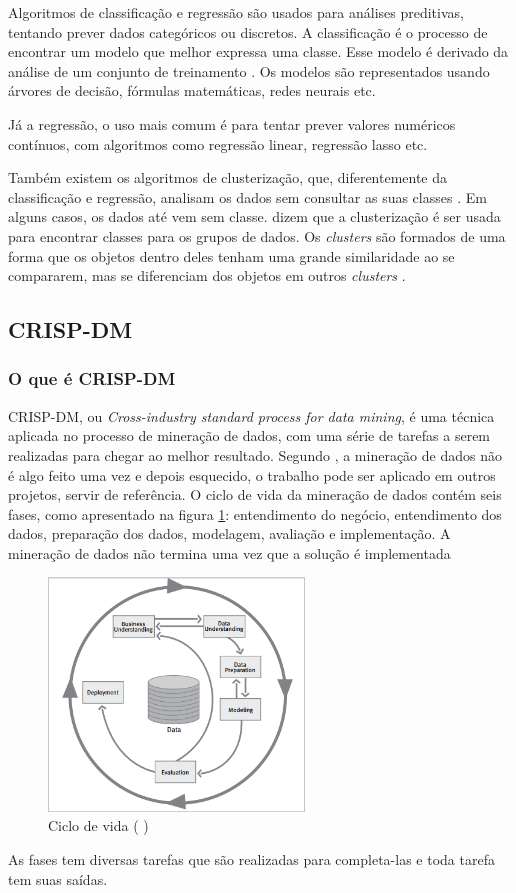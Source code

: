 Algoritmos de classificação e regressão são usados para análises preditivas, tentando prever dados categóricos ou discretos. A classificação é o processo de encontrar um modelo que melhor expressa uma classe. Esse modelo é derivado da análise de um conjunto de treinamento \citep{jmj}. Os modelos são representados usando árvores de decisão, fórmulas matemáticas, redes neurais etc.

Já a regressão, o uso mais comum é para tentar prever valores numéricos contínuos, com algoritmos como regressão linear, regressão lasso etc.

Também existem os algoritmos de clusterização, que, diferentemente da classificação e regressão, analisam os dados sem consultar as suas classes \citep{jmj}. Em alguns casos, os dados até vem sem classe. \citeauthor{jmj} dizem que a clusterização é ser usada para encontrar classes para os grupos de dados. Os \textit{clusters} são formados de uma forma que os objetos dentro deles tenham uma grande similaridade ao se compararem, mas se diferenciam dos objetos em outros \textit{clusters} \citep{jmj}.

\subsection{CRISP-DM}
\subsubsection{O que é CRISP-DM}
CRISP-DM, ou\textit{ Cross-industry standard process for data mining}, é uma técnica aplicada no processo de mineração de dados, com uma série de tarefas a serem realizadas para chegar ao melhor resultado.
Segundo , a mineração de dados não é algo feito uma vez e depois esquecido, o trabalho pode ser aplicado em outros projetos, servir de referência.
O ciclo de vida da mineração de dados contém seis fases, como apresentado na figura \ref{crispcycle}: entendimento do negócio, entendimento dos dados, preparação dos dados, modelagem, avaliação e implementação. 
A mineração de dados não termina uma vez que a solução é implementada \citep{crispmanual}
\begin{figure}[H]
\centering
\includegraphics[height=6.2cm]{imagens/lifecycle.png}
\caption{Ciclo de vida (\citeauthor{crispmanual} \citeyear{crispmanual})}
\label{crispcycle}
\end{figure}
As fases tem diversas tarefas que são realizadas para completa-las e toda tarefa tem suas saídas.
